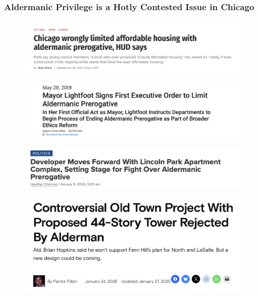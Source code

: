 \begin{frame}
	\frametitle{Aldermanic Privilege is a Hotly Contested Issue in Chicago} 
    \begin{minipage}{0.5\textwidth}
        \begin{figure}
            \centering
            \includegraphics[width=\textwidth]{images/hud_report_headline.png}
		\end{figure}
		\begin{figure}
			\centering
			\includegraphics[width=\textwidth]{images/lightfoot_order.png}
		\end{figure}
		\begin{figure}
			\centering
			\includegraphics[width=\textwidth]{images/alderman_fight.png}
		\end{figure}
        \end{minipage}
        \hfill
        \begin{minipage}{0.48\textwidth}
        \begin{figure}
            \centering
            \includegraphics[width=\textwidth]{images/old_town_towers.png}

\end{figure}
\end{minipage}
\end{frame}
